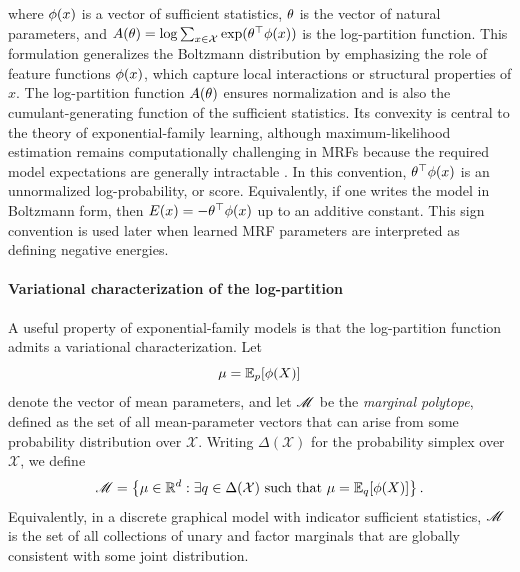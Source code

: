where $\phi(x)$ is a vector of sufficient statistics, $\theta$ is the vector of natural parameters, and $A(\theta)=\log \sum_{x\in\mathcal{X}} \exp(\theta^\top \phi(x))$ is the log-partition function. This formulation generalizes the Boltzmann distribution by emphasizing the role of feature functions $\phi(x)$, which capture local interactions or structural properties of $x$. The log-partition function $A(\theta)$ ensures normalization and is also the cumulant-generating function of the sufficient statistics. Its convexity is central to the theory of exponential-family learning, although maximum-likelihood estimation remains computationally challenging in MRFs because the required model expectations are generally intractable \citep{wainwright_graphical_2007}. In this convention, $\theta^\top\phi(x)$ is an unnormalized log-probability, or score. Equivalently, if one writes the model in Boltzmann form, then $E(x)=-\theta^\top\phi(x)$ up to an additive constant. This sign convention is used later when learned MRF parameters are interpreted as defining negative energies.

\paragraph{Variational characterization of the log-partition}

A useful property of exponential-family models is that the log-partition function admits a variational characterization. Let
\begin{equation}
    \mu = \mathbb{E}_{p}[\phi(X)]
\end{equation}
denote the vector of mean parameters, and let $\mathscr{M}$ be the \emph{marginal polytope}, defined as the set of all mean-parameter vectors that can arise from some probability distribution over $\mathcal{X}$. Writing $\Delta(\mathcal{X})$ for the probability simplex over $\mathcal{X}$, we define
\begin{equation}
    \MARGINALP = \left\{
        \mu \in \mathbb{R}^d : \exists q \in \Delta(\mathcal{X}) \ \text{such that}\ \mu = \mathbb{E}_{q}[\SSTAT(X)]
    \right\}.
\end{equation}
Equivalently, in a discrete graphical model with indicator sufficient statistics, $\mathscr{M}$ is the set of all collections of unary and factor marginals that are globally consistent with some joint distribution.

